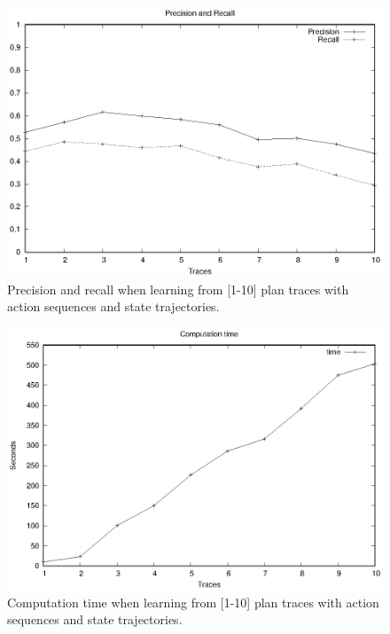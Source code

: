 


\begin{figure}[hbt!]
	\centering
	\includegraphics[width=0.65\linewidth]{figures/input_size_0_0_precision.eps}
	\caption{Precision and recall when learning from [1-10] plan traces with \NO action sequences and \NO state trajectories.}
	\label{fig:pspace_quality}
\end{figure}
\begin{figure}[hbt!]
	\centering
	\includegraphics[width=0.65\linewidth]{figures/input_size_0_0_time.eps}
	\caption{Computation time when learning from [1-10] plan traces with \NO action sequences and \NO state trajectories.}
	\label{fig:pspace_time}
\end{figure}



